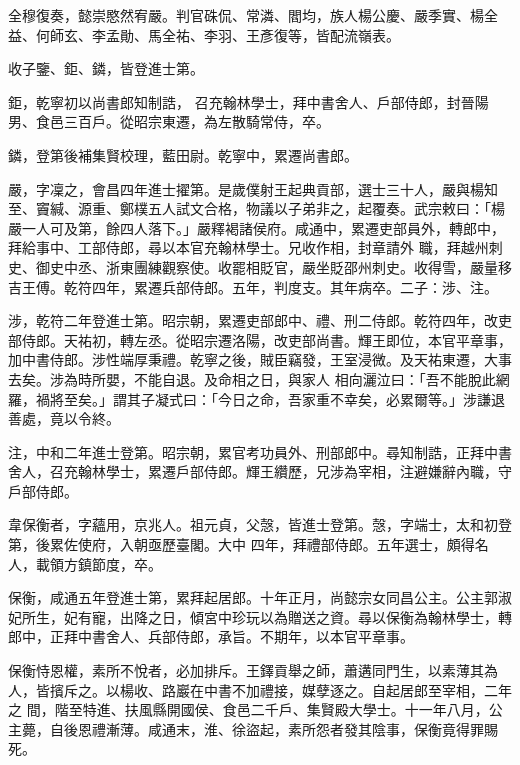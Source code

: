 \begin{pinyinscope}
 全穆復奏，懿崇愍然宥嚴。判官硃侃、常潾、閻均，族人楊公慶、嚴季實、楊全益、何師玄、李孟勛、馬全祐、李羽、王彥復等，皆配流嶺表。



 收子鑒、鉅、鏻，皆登進士第。



 鉅，乾寧初以尚書郎知制誥，
 召充翰林學士，拜中書舍人、戶部侍郎，封晉陽男、食邑三百戶。從昭宗東遷，為左散騎常侍，卒。



 鏻，登第後補集賢校理，藍田尉。乾寧中，累遷尚書郎。



 嚴，字凜之，會昌四年進士擢第。是歲僕射王起典貢部，選士三十人，嚴與楊知至、竇緘、源重、鄭樸五人試文合格，物議以子弟非之，起覆奏。武宗敕曰：「楊嚴一人可及第，餘四人落下。」嚴釋褐諸侯府。咸通中，累遷吏部員外，轉郎中，拜給事中、工部侍郎，尋以本官充翰林學士。兄收作相，封章請外
 職，拜越州刺史、御史中丞、浙東團練觀察使。收罷相貶官，嚴坐貶邵州刺史。收得雪，嚴量移吉王傅。乾符四年，累遷兵部侍郎。五年，判度支。其年病卒。二子：涉、注。



 涉，乾符二年登進士第。昭宗朝，累遷吏部郎中、禮、刑二侍郎。乾符四年，改吏部侍郎。天祐初，轉左丞。從昭宗遷洛陽，改吏部尚書。輝王即位，本官平章事，加中書侍郎。涉性端厚秉禮。乾寧之後，賊臣竊發，王室浸微。及天祐東遷，大事去矣。涉為時所嬰，不能自退。及命相之日，與家人
 相向灑泣曰：「吾不能脫此網羅，禍將至矣。」謂其子凝式曰：「今日之命，吾家重不幸矣，必累爾等。」涉謙退善處，竟以令終。



 注，中和二年進士登第。昭宗朝，累官考功員外、刑部郎中。尋知制誥，正拜中書舍人，召充翰林學士，累遷戶部侍郎。輝王纘歷，兄涉為宰相，注避嫌辭內職，守戶部侍郎。



 韋保衡者，字蘊用，京兆人。祖元貞，父愨，皆進士登第。愨，字端士，太和初登第，後累佐使府，入朝亟歷臺閣。大中
 四年，拜禮部侍郎。五年選士，頗得名人，載領方鎮節度，卒。



 保衡，咸通五年登進士第，累拜起居郎。十年正月，尚懿宗女同昌公主。公主郭淑妃所生，妃有寵，出降之日，傾宮中珍玩以為贈送之資。尋以保衡為翰林學士，轉郎中，正拜中書舍人、兵部侍郎，承旨。不期年，以本官平章事。



 保衡恃恩權，素所不悅者，必加排斥。王鐸貢舉之師，蕭遘同門生，以素薄其為人，皆擯斥之。以楊收、路巖在中書不加禮接，媒孽逐之。自起居郎至宰相，二年之
 間，階至特進、扶風縣開國侯、食邑二千戶、集賢殿大學士。十一年八月，公主薨，自後恩禮漸薄。咸通末，淮、徐盜起，素所怨者發其陰事，保衡竟得罪賜死。




\end{pinyinscope}
